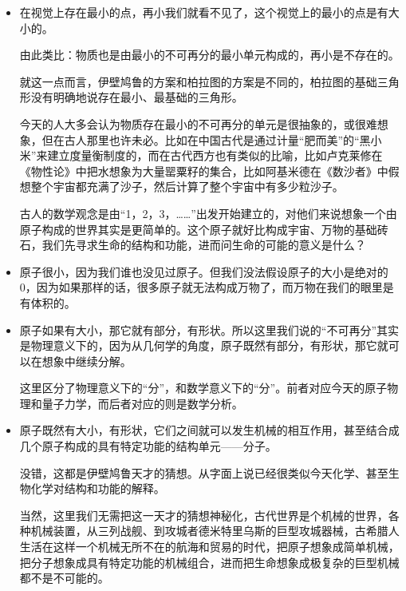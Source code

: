 \begin{itemize}
\item 

在视觉上存在最小的点，再小我们就看不见了，这个视觉上的最小的点是有大小的。

由此类比：物质也是由最小的不可再分的最小单元构成的，再小是不存在的。

就这一点而言，伊壁鸠鲁的方案和柏拉图的方案是不同的，柏拉图的基础三角形没有明确地说存在最小、最基础的三角形。

今天的人大多会认为物质存在最小的不可再分的单元是很抽象的，或很难想象，但在古人那里也许未必。比如在中国古代是通过计量“肥而美”的“黑小米”来建立度量衡制度的，而在古代西方也有类似的比喻，比如卢克莱修在《物性论》中把水想象为大量罂粟籽的集合，比如阿基米德在《数沙者》中假想整个宇宙都充满了沙子，然后计算了整个宇宙中有多少粒沙子。

古人的数学观念是由“1，2，3，……”出发开始建立的，对他们来说想象一个由原子构成的世界其实是更简单的。这个原子就好比构成宇宙、万物的基础砖石，我们先寻求生命的结构和功能，进而问生命的可能的意义是什么？

\item

原子很小，因为我们谁也没见过原子。但我们没法假设原子的大小是绝对的0，因为如果那样的话，很多原子就无法构成万物了，而万物在我们的眼里是有体积的。

\item

原子如果有大小，那它就有部分，有形状。所以这里我们说的“不可再分”其实是物理意义下的，因为从几何学的角度，原子既然有部分，有形状，那它就可以在想象中继续分解。

这里区分了物理意义下的“分”，和数学意义下的“分”。前者对应今天的原子物理和量子力学，而后者对应的则是数学分析。

\item

原子既然有大小，有形状，它们之间就可以发生机械的相互作用，甚至结合成几个原子构成的具有特定功能的结构单元——分子。

没错，这都是伊壁鸠鲁天才的猜想。从字面上说已经很类似今天化学、甚至生物化学对结构和功能的解释。

当然，这里我们无需把这一天才的猜想神秘化，古代世界是个机械的世界，各种机械装置，从三列战舰、到攻城者德米特里乌斯的巨型攻城器械，古希腊人生活在这样一个机械无所不在的航海和贸易的时代，把原子想象成简单机械，把分子想象成具有特定功能的机械组合，进而把生命想象成极复杂的巨型机械都不是不可能的。

\end{itemize}

